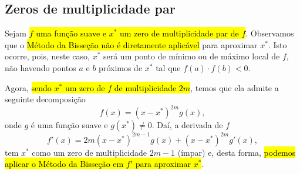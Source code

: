 \subsection{Zeros de multiplicidade par}

Sejam \hl{$f$ uma função suave e $x^*$ um zero de multiplicidade par de $f$}. Observamos que o \hl{Método da Bisseção não é diretamente aplicável} para aproximar $x^*$. Isto ocorre, pois, neste caso, $x^*$ será um ponto de mínimo ou de máximo local de $f$, não havendo pontos $a$ e $b$ próximos de $x^*$ tal que $f(a)\cdot f(b) < 0$.

Agora, \hl{sendo $x^*$ um zero de $f$ de multiplicidade $2m$}, temos que ela admite a seguinte decomposição
\begin{equation}
  f(x) = (x-x^*)^{2m}g(x),
\end{equation}
onde $g$ é uma função suave e $g(x^*)\neq 0$. Daí, a derivada de $f$
\begin{equation}
  f'(x) = 2m(x-x^*)^{2m-1}g(x) + (x-x^*)^{2m}g'(x),
\end{equation}
tem $x^*$ como um zero de multiplicidade $2m-1$ (ímpar) e, desta forma, \hl{podemos aplicar o Método da Bisseção em $f'$ para aproximar $x^*$}.

